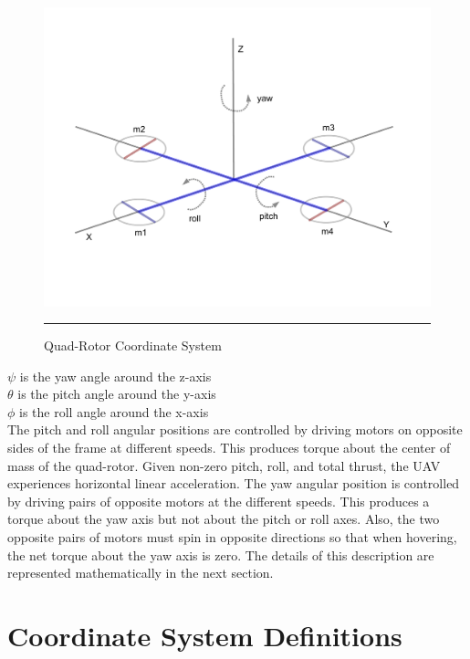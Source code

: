 \begin{figure}[htbp]
  \centering
    \includegraphics[width=\textwidth]{Figures/coords.pdf}
    \rule{35em}{0.5pt}
  \caption[Quad-Rotor Coordinate System]{Quad-Rotor Coordinate System}
  \label{fig:Quad-Rotor Coordinate System}
\end{figure}


\indent $ \psi $ is the yaw angle around the z-axis\\
\indent $ \theta $ is the pitch angle around the y-axis\\
\indent $ \phi $ is the roll angle around the x-axis\\



 The pitch and roll angular positions are controlled by driving motors on opposite sides of the frame at different speeds. This produces torque about the center of mass of the quad-rotor. Given non-zero pitch, roll, and total thrust, the UAV experiences horizontal linear acceleration. The yaw angular position is controlled by driving pairs of opposite motors at the different speeds. This produces a torque about the yaw axis but not about the pitch or roll axes. Also, the two opposite pairs of motors must spin in opposite directions so that when hovering, the net torque about the yaw axis is zero. The details of this description are represented mathematically in the next section.



\section{Coordinate System Definitions}

